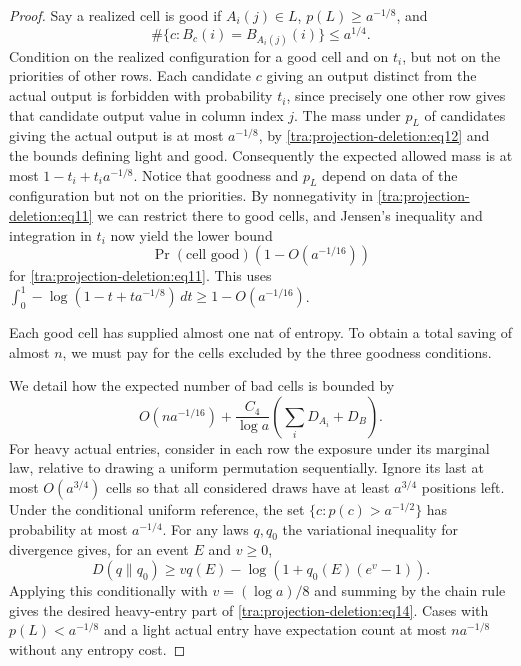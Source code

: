 \begin{proof}
Say a realized cell is good if \(A_i(j)\in L\), \(p(L)\ge a^{-1/8}\), and
\begin{equation}
\#\{c:B_c(i)=B_{A_i(j)}(i)\}\le a^{1/4}.
\label{tra:projection-deletion:eq12}
\end{equation}
Condition on the realized configuration for a good cell and on \(t_i\), but not on the priorities of other rows. Each candidate \(c\) giving an output distinct from the actual output is forbidden with probability \(t_i\), since precisely one other row gives that candidate output value in column index \(j\). The mass under \(p_L\) of candidates giving the actual output is at most \(a^{-1/8}\), by \eqref{tra:projection-deletion:eq12} and the bounds defining light and good. Consequently the expected allowed mass is at most \(1-t_i+t_i a^{-1/8}\). Notice that goodness and \(p_L\) depend on data of the configuration but not on the priorities. By nonnegativity in \eqref{tra:projection-deletion:eq11} we can restrict there to good cells, and Jensen's inequality and integration in \(t_i\) now yield the lower bound
\begin{equation}
\Pr(\text{cell good})\left(1-O(a^{-1/16})\right)
\label{tra:projection-deletion:eq13}
\end{equation}
for \eqref{tra:projection-deletion:eq11}. This uses \(\int_0^1 -\log(1-t+t a^{-1/8})\,dt \ge 1-O(a^{-1/16})\).

Each good cell has supplied almost one nat of entropy. To obtain a total saving of almost $n$, we must pay for the cells excluded by the three goodness conditions.

We detail how the expected number of bad cells is bounded by
\begin{equation}
O(n a^{-1/16})+\frac{C_4}{\log a}\left(\sum_i D_{A_i}+D_B\right).
\label{tra:projection-deletion:eq14}
\end{equation}
For heavy actual entries, consider in each row the exposure under its marginal law, relative to drawing a uniform permutation sequentially. Ignore its last at most \(O(a^{3/4})\) cells so that all considered draws have at least \(a^{3/4}\) positions left. Under the conditional uniform reference, the set \(\{c:p(c)>a^{-1/2}\}\) has probability at most \(a^{-1/4}\). For any laws \(q,q_0\) the variational inequality for divergence gives, for an event \(E\) and \(v\ge0\),
\begin{equation}
D(q\|q_0)\ge v q(E)-\log(1+q_0(E)(e^v-1)).
\label{tra:projection-deletion:eq15}
\end{equation}
Applying this conditionally with \(v=(\log a)/8\) and summing by the chain rule gives the desired heavy-entry part of \eqref{tra:projection-deletion:eq14}. Cases with \(p(L)<a^{-1/8}\) and a light actual entry have expectation count at most \(n a^{-1/8}\) without any entropy cost.


\end{proof}
